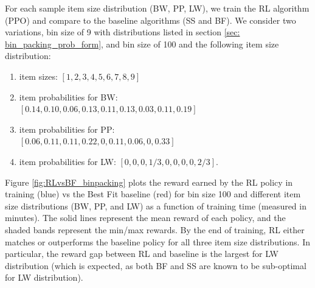 \documentclass[letterpaper]{article} %
\begin{document}
For each sample item size distribution (BW, PP, LW), we train the RL algorithm (PPO) and compare to the baseline algorithms (SS and BF).  We consider two variations, bin size of 9 with distributions listed in section \ref{sec: bin_packing_prob_form}, and bin size of 100 and the following item size distribution:

\begin{enumerate}[topsep=0pt,itemsep=-1ex,partopsep=1ex,parsep=1ex]
	\item item sizes: $[1, 2, 3, 4, 5, 6, 7, 8, 9]$
	\item item probabilities for BW: \\ $[0.14, 0.10, 0.06, 0.13, 0.11, 0.13, 0.03, 0.11, 0.19]$
	\item item probabilities for PP: \\ $[0.06, 0.11, 0.11, 0.22, 0, 0.11, 0.06, 0, 0.33]$
	\item item probabilities for LW: $[0, 0, 0, 1/3, 0, 0, 0, 0, 2/3]$.
\end{enumerate}

%
%

Figure \ref{fig:RLvsBF_binpacking} plots the reward earned by the RL policy in training (blue) vs the Best Fit baseline (red) for bin size 100 and different item size distributions (BW, PP, and LW) as a function of training time (measured in minutes). The solid lines represent the mean reward of each policy, and the shaded bands represent the min/max rewards. By the end of training, RL either matches or outperforms the baseline policy for all three item size distributions. In particular, the reward gap between RL and baseline is the largest for LW distribution (which is expected, as both BF and SS are known to be sub-optimal for LW distribution). %
\end{document}
